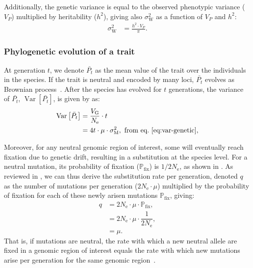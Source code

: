 \documentclass{article}
\newcommand{\Multiply}{\cdot}
\DeclareMathOperator{\Var}{\text{Var}}
\newcommand{\Ne}{N_{\text{e}}}
\newcommand{\proba}{\mathbb{P}}
\newcommand{\pfix}{\proba_{\text{fix}}}
\newcommand{\Time}{t}
\newcommand{\Trait}{P}
\newcommand{\Heritability}{h^2}
\newcommand{\MeanTrait}{\bar{\Trait_{\Time}}}
\newcommand{\VarPhy}{\Var \left[\MeanTrait\right]}
\newcommand{\MutationRate}{\mu}
\newcommand{\SubRate}{q}
\newcommand{\VarPhenotype}{V_{\Trait}}
\newcommand{\VarGenetic}{V_{\mathrm{G}}}
\newcommand{\RateMut}{\sigma^2_{\mathrm{M}}}
\newcommand{\RateWhithin}{\sigma^2_{\mathrm{W}}}
\begin{document}
Additionally, the genetic variance is equal to the observed phenotypic variance ($\VarPhenotype$) multiplied by heritability ($\Heritability$), giving also $\RateWhithin$ as a function of $\VarPhenotype$ and $\Heritability$:
\begin{align}
    \RateWhithin & = \frac{\Heritability \Multiply \VarPhenotype }{\pi }. \label{eq:rate-pheno-pop}
\end{align}

\subsubsection*{Phylogenetic evolution of a trait}

At generation $\Time$, we denote $\MeanTrait$ as the mean value of the trait over the individuals in the species.
If the trait is neutral and encoded by many loci, $\MeanTrait$ evolves as Brownian process~\cite{hansen_translating_1996}.
After the species has evolved for $\Time$ generations, the variance of $\MeanTrait$, $\VarPhy$, is given by \textcite{hansen_translating_1996} as:
\begin{align}
    \VarPhy & = \frac{\VarGenetic}{\Ne} \Multiply \Time \\
    & = 4 \Time \Multiply \MutationRate \Multiply \RateMut \label{eq:covar},\text{ from eq.~\ref{eq:var-genetic}},
\end{align}

Moreover, for any neutral genomic region of interest, some will eventually reach fixation due to genetic drift, resulting in a substitution at the species level.
For a neutral mutation, its probability of fixation ($\pfix$) is $1/2\Ne$, as shown in \textcite{kimura_probability_1962}.
As reviewed in \textcite{mccandlish_modeling_2014}, we can thus derive the substitution rate per generation, denoted $\SubRate$ as the number of mutations per generation ($2\Ne \Multiply \MutationRate$) multiplied by the probability of fixation for each of these newly arisen mutations $\pfix$, giving:
\begin{align}
    \SubRate & = 2 \Ne \Multiply \MutationRate \Multiply \pfix, \\
    & = 2 \Ne  \Multiply \MutationRate  \Multiply \dfrac{1}{2\Ne}, \\
    & = \MutationRate. \label{eq:substitution-rate}
\end{align}
That is, if mutations are neutral, the rate with which a new neutral allele are fixed in a genomic region of interest equals the rate with which new mutations arise per generation for the same genomic region~\cite{kimura_evolutionary_1968}.
\end{document}
